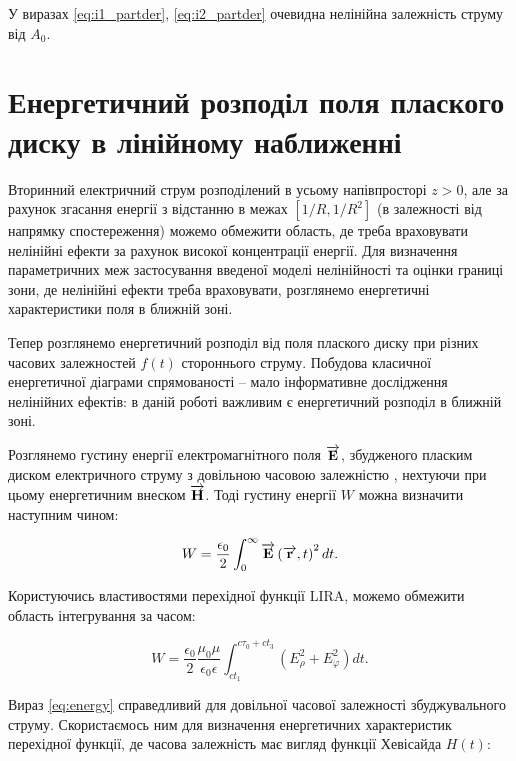 У виразах \eqref{eq:i1_partder}, \eqref{eq:i2_partder} очевидна нелінійна 
залежність струму від $ A_0 $.

\section{Енергетичний розподіл поля плаского диску в лінійному наближенні}

Вторинний електричний струм розподілений в усьому напівпросторі $ z > 0 $,
але за рахунок згасання енергії з відстанню в межах $ [1/R, 1/R^2] $ (в 
залежності від напрямку спостереження) можемо обмежити область, де треба 
враховувати нелінійні ефекти за рахунок високої концентрації енергії. Для 
визначення параметричних меж застосування введеної моделі нелінійності та 
оцінки границі зони, де нелінійні ефекти треба враховувати, розглянемо 
енергетичні характеристики поля в ближній зоні.

Тепер розглянемо енергетичний розподіл від поля плаского диску при різних
часових залежностей $ f(t) $ стороннього струму. Побудова класичної 
енергетичної діаграми спрямованості -- мало інформативне дослідження 
нелінійних ефектів: в даній роботі важливим є енергетичний розподіл в 
ближній зоні.

Розглянемо густину енергії електромагнітного поля $ \overrightarrow{\mathbf E} $, збудженого 
пласким диском електричного струму з довільною часовою залежністю
\cite{imp:Schantz2018}, нехтуючи при цьому енергетичним внеском 
$ \overrightarrow{\mathbf H} $. Тоді густину енергії $ W $ можна визначити наступним чином: 


\begin{equation} \label{eq:energy}
W = \frac{\epsilon_0}{2} \int_0^\infty \overrightarrow{\mathbf E} \left( \overrightarrow{\mathbf r},t \right)^2 dt.
\end{equation}

Користуючись властивостями перехідної функції LIRA, можемо обмежити
область інтегрування за часом:

\begin{equation} \label{eq:energy}
W = \frac{\epsilon_0}{2} \frac{\mu_0 \mu}{\epsilon_0 \epsilon}
\int_{ct_1}^{c\tau_0+ct_3} \left( E_\rho^2 + E_\varphi^2 \right) dt.
\end{equation}

Вираз \eqref{eq:energy} справедливий для довільної часової залежності 
збуджувального струму. Скористаємось ним для визначення енергетичних 
характеристик перехідної функції, де часова залежність має вигляд функції
Хевісайда $ H(t) $:


